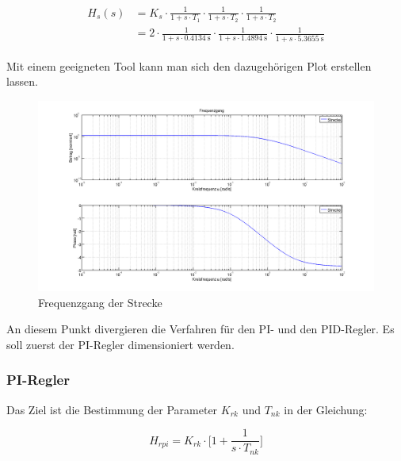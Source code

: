 \begin{gather} \label{eq:transfer:plant}
    \begin{split}
        H_s (s) & = K_s
                  \cdot \frac{1}{1 + s \cdot T_1}
                  \cdot \frac{1}{1 + s \cdot T_2}
                  \cdot \frac{1}{1 + s \cdot T_2}                     \\
                & = 2
                  \cdot \frac{1}{1 + s \cdot \SI{0.4134}{\second}}
                  \cdot \frac{1}{1 + s \cdot \SI{1.4894}{\second}}
                  \cdot \frac{1}{1 + s \cdot \SI{5.3655}{\second}}
    \end{split}
\end{gather}

Mit einem  geeigneten Tool  kann man sich  den dazugeh\"origen  Plot erstellen
lassen.

\begin{figure}[h! width=\pagewidth]
    \includegraphics[width=\textwidth]{images/streckeFrequenzgang.png}
    \caption{%
        Frequenzgang der Strecke%
    }
    \label{fig:plant_freq}
\end{figure}

An diesem Punkt divergieren die Verfahren f\"ur den PI- und den PID-Regler. Es
soll zuerst der PI-Regler dimensioniert werden.

\subsubsection*{PI-Regler}

Das  Ziel ist  die  Bestimmung  der Parameter  $K_{rk}$  und  $T_{nk}$ in  der
Gleichung:

\begin{equation} \label{eq:pi:target}
    H_{rpi} = K_{rk} \cdot \biggl[ 1 + \frac{1}{s \cdot T_{nk}} \biggr]
\end{equation}

